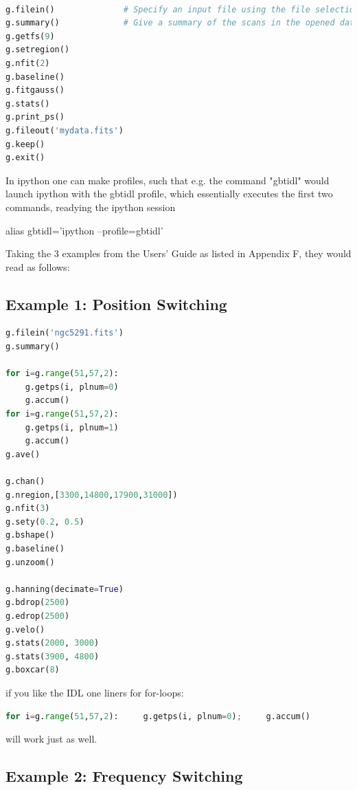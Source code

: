 \documentclass[12pt,a4paper]{article}
\begin{document}
\begin{lstlisting}[language=python]
% gbtidl                # start up an ipython session with the gbtidl profile

g.filein()              # Specify an input file using the file selection GUI
g.summary()             # Give a summary of the scans in the opened data file
g.getfs(9)
g.setregion()
g.nfit(2)
g.baseline()
g.fitgauss()
g.stats()
g.print_ps()
g.fileout('mydata.fits')
g.keep()
g.exit()

\end{lstlisting}


In ipython one can make profiles, such that e.g. the command "gbtidl" would launch ipython with
the gbtidl profile, which essentially executes the first two commands, readying the ipython
session 

    alias gbtidl='ipython --profile=gbtidl'

Taking the 3 examples from the Users' Guide as listed in Appendix F,
they would read as follows:

\subsection{Example 1:   Position Switching}

\begin{lstlisting}[language=python]
g.filein('ngc5291.fits')
g.summary()

for i=g.range(51,57,2):
    g.getps(i, plnum=0)
    g.accum()
for i=g.range(51,57,2):
    g.getps(i, plnum=1)
    g.accum()
g.ave()

g.chan()
g.nregion,[3300,14800,17900,31000])
g.nfit(3)
g.sety(0.2, 0.5)
g.bshape()
g.baseline()
g.unzoom()

g.hanning(decimate=True)
g.bdrop(2500)
g.edrop(2500)
g.velo()
g.stats(2000, 3000)
g.stats(3900, 4800)
g.boxcar(8)
\end{lstlisting}

if you like the IDL one liners for for-loops:

\begin{lstlisting}[language=python]
  for i=g.range(51,57,2):     g.getps(i, plnum=0);     g.accum()
\end{lstlisting}

will work just as well.

\subsection{Example 2: Frequency Switching}
\end{document}
